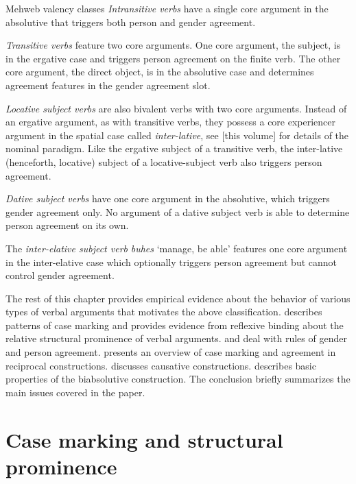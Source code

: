 ﻿\documentclass[output=paper]{langsci/langscibook}
\begin{document}
{\let\raggedright\relax
\ea \label{ex:7:1} %
Mehweb valency classes
\ea  %
\emph{Intransitive verbs} have a single core argument in the
absolutive that triggers both person and gender agreement.

\ex %
\emph{Transitive verbs} feature two core arguments. One core
argument, the subject, is in the ergative case and triggers person
agreement on the finite verb. The other core argument, the direct
object, is in the absolutive case and determines agreement features in
the gender agreement slot.

\ex %
\emph{Locative subject verbs} are also bivalent verbs with two core
arguments. Instead of an ergative argument, as with transitive verbs,
they possess a core experiencer argument in the spatial case called
\emph{inter-lative}, see \citet{chechuro2019} [this volume] for details of the
nominal paradigm. Like the ergative subject of a transitive verb, the
inter-lative (henceforth, locative) subject of a locative-subject verb
also triggers person agreement.

\ex %
\emph{Dative subject verbs} have one core argument in the
absolutive, which triggers gender agreement only. No argument of a dative subject
verb is able to determine person agreement on its own.

\ex %
The \emph{inter-elative subject verb} \emph{buhes} `manage, be able'
features one core argument in the inter-elative case which optionally
triggers person agreement but cannot control gender agreement.
\z
\z
}

The rest of this chapter provides empirical evidence about the behavior of
various types of verbal arguments that motivates the above
classification. 
describes patterns of case marking and
provides evidence from reflexive binding about the relative structural
prominence of verbal arguments.  and  deal with rules of
gender and person agreement.  presents an overview of case
marking and agreement in reciprocal constructions.  discusses
causative constructions.  describes basic properties of the
biabsolutive construction. The conclusion briefly summarizes the main
issues covered in the paper.

\clearpage

\section{Case marking and structural prominence}\label{Case-marking-and-structural-prominence}
\end{document}
